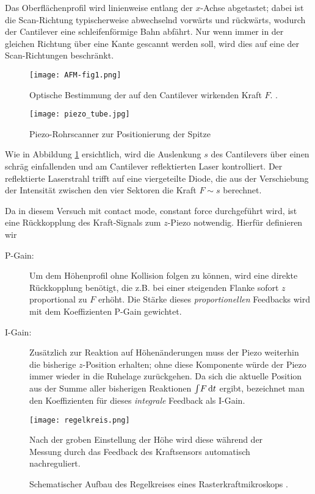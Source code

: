 Das Oberflächenprofil wird linienweise entlang der $x$-Achse abgetastet; dabei ist die Scan-Richtung typischerweise abwechselnd vorwärts und rückwärts, wodurch der Cantilever eine schleifenförmige Bahn abfährt. Nur wenn immer in der gleichen Richtung über eine Kante gescannt werden soll, wird dies auf eine der Scan-Richtungen beschränkt.


\begin{figure}[p]
	\centering
	\texttt{[image: AFM-fig1.png]}
	\caption{Optische Bestimmung der auf den Cantilever wirkenden Kraft $F$. \cite{lit:grenoble}.}
	\label{fig:laser}
\end{figure}

\begin{figure}[p]
	\centering
	\texttt{[image: piezo\_tube.jpg]}
	\caption{Piezo-Rohrscanner zur Positionierung der Spitze \cite{lit:tube}}
	\label{fig:tube}
\end{figure}

Wie in Abbildung \ref{fig:laser} ersichtlich, wird die Auslenkung $s$ des Cantilevers über einen schräg einfallenden und am Cantilever reflektierten Laser kontrolliert. Der reflektierte Laserstrahl trifft auf eine viergeteilte Diode, die aus der Verschiebung der Intensität zwischen den vier Sektoren die Kraft $F \sim s$ berechnet.

Da in diesem Versuch mit contact mode, constant force durchgeführt wird, ist eine Rückkopplung des Kraft-Signals zum $z$-Piezo notwendig. Hierfür definieren wir
\begin{description}
\item[P-Gain:] Um dem Höhenprofil ohne Kollision folgen zu können, wird eine direkte Rückkopplung benötigt, die z.B. bei einer steigenden Flanke sofort $z$ proportional zu $F$ erhöht. Die Stärke dieses \emph{proportionellen} Feedbacks wird mit dem Koeffizienten P-Gain gewichtet.
\item[I-Gain:] Zusätzlich zur Reaktion auf Höhenänderungen muss der Piezo weiterhin die bisherige $z$-Position erhalten; ohne diese Komponente würde der Piezo immer wieder in die Ruhelage zurückgehen. Da sich die aktuelle Position aus der Summe aller bisherigen Reaktionen $\int\! F \,\mathrm{d} t$ ergibt, bezeichnet man den Koeffizienten für dieses \emph{integrale} Feedback als I-Gain.
\end{description}

\begin{figure}[p]
	\centering
	\texttt{[image: regelkreis.png]}
	\caption{Schematischer Aufbau des Regelkreises eines Rasterkraftmikroskops \cite{lit:guide}.}
			Nach der groben Einstellung der Höhe wird diese während der Messung durch das Feedback des Kraftsensors automatisch nachreguliert.
	\label{fig:feedback}
\end{figure}

